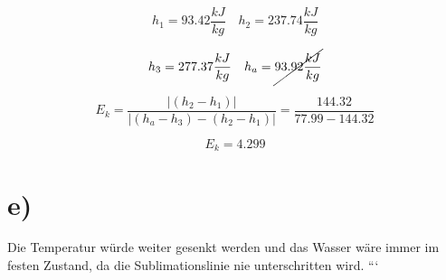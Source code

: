 \begin{equation*}
    h_1 = 93.42 \frac{kJ}{kg} \quad h_2 = 237.74 \frac{kJ}{kg}
\end{equation*}

\begin{equation*}
    h_3 = 277.37 \frac{kJ}{kg} \quad h_a = \cancel{93.92 \frac{kJ}{kg}}
\end{equation*}

\begin{equation*}
    E_k = \frac{| (h_2 - h_1) |}{| (h_a - h_3) - (h_2 - h_1) |} = \frac{144.32}{77.99 - 144.32}
\end{equation*}

\begin{equation*}
    \boxed{E_k = 4.299}
\end{equation*}

\section*{e)}
Die Temperatur würde weiter gesenkt werden und das Wasser wäre immer im festen Zustand, da die Sublimationslinie nie unterschritten wird.
```